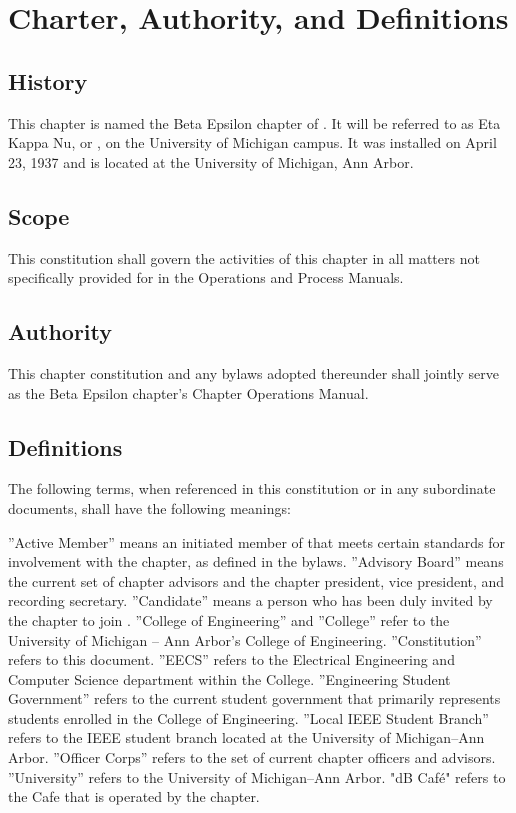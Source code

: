 \chapter{Charter, Authority, and Definitions}\label{sec:definitions}

\section{History}
This chapter is named the Beta Epsilon chapter of \hkn. It will be referred to as Eta Kappa Nu, or \hkn, on the University of Michigan campus. It was installed on April 23, 1937 and is located at the University of Michigan, Ann Arbor.

\section{Scope}
This constitution shall govern the activities of this chapter in all matters not specifically provided for in the \hkn Operations and Process Manuals.

\section{Authority}
This chapter constitution and any bylaws adopted thereunder shall jointly serve as the Beta Epsilon chapter's Chapter Operations Manual.

\section{Definitions}
The following terms, when referenced in this constitution or in any subordinate documents, shall have the following meanings:
\begin{enumsubsection}

\itemnotoc ''Active Member'' means an initiated member of \hkn that meets certain standards for involvement with the chapter, as defined in the bylaws.
\itemnotoc ''Advisory Board'' means the current set of chapter advisors and the chapter president, vice president, and recording secretary.
\itemnotoc ''Candidate'' means a person who has been duly invited by the chapter to join \hkn.
\itemnotoc ''College of Engineering'' and ''College'' refer to the University of Michigan -- Ann Arbor's College of Engineering.
\itemnotoc ''Constitution'' refers to this document.
\itemnotoc ''EECS'' refers to the Electrical Engineering and Computer Science department within the College.
\itemnotoc ''Engineering Student Government'' refers to the current student government that primarily represents students enrolled in the College of Engineering.
\itemnotoc ''Local IEEE Student Branch'' refers to the IEEE student branch located at the University of Michigan--Ann Arbor.
\itemnotoc ''Officer Corps'' refers to the set of current chapter officers and advisors.
\itemnotoc ''University'' refers to the University of Michigan--Ann Arbor.
\itemnotoc "dB Caf\'{e}" refers to the Cafe that is operated by the chapter.

\end{enumsubsection}

